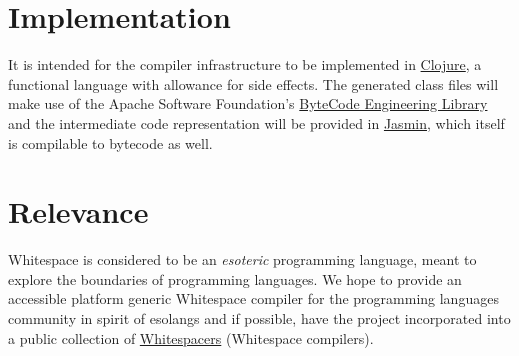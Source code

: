 \documentclass[10pt,letter]{article}
\begin{document}
	\section{Implementation}
		It is intended for the compiler infrastructure to be implemented in \href{https://clojure.org/index}{Clojure}, a functional language with allowance for side effects. The generated class files will make use of the Apache Software Foundation's \href{https://commons.apache.org/proper/commons-bcel/index.html}{ByteCode Engineering Library} and the intermediate code representation will be provided in \href{http://jasmin.sourceforge.net/}{Jasmin}, which itself is compilable to bytecode as well.
	\section{Relevance}
		Whitespace is considered to be an \textit{esoteric} programming language, meant to explore the boundaries of programming languages. We hope to provide an accessible platform generic Whitespace compiler for the programming languages community in spirit of esolangs and if possible, have the project incorporated into a public collection of \href{https://github.com/hostilefork/whitespacers/}{Whitespacers} (Whitespace compilers).
\end{document}
